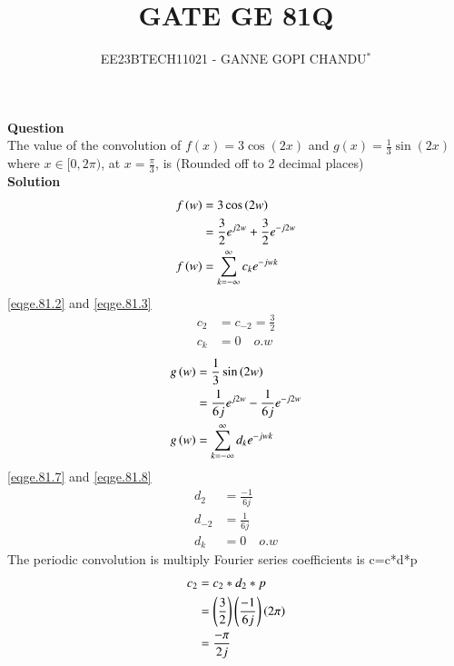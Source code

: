 \documentclass[journal,12pt,twocolumn]{IEEEtran}
\theoremstyle{remark}
\begin{document}

\vspace{3cm}
\title{GATE GE 81Q}
\author{EE23BTECH11021 - GANNE GOPI CHANDU$^{*}$%
}
\maketitle
\bigskip
\renewcommand{\thefigure}{\theenumi}
\renewcommand{\thetable}{\theenumi}

\textbf{Question}\\
The value of the convolution of $f(x) = 3\cos(2x)$ and $g(x) = \frac{1}{3}\sin(2x)$ where $x \in [0, 2\pi)$, at $x = \frac{\pi}{3}$, is (Rounded off to 2 decimal places)\\
\textbf{Solution}\\
\fi
\begin{align}
    f\brak{w}&=3\cos\brak{2w}\\
    &=\frac{3}{2}e^{j2w}+\frac{3}{2}e^{-j2w} \label{eqge.81.2}\\
    f\brak{w}&=\sum_{k=-\infty}^{\infty}c_k e^{-j w k} \label{eqge.81.3}
\end{align}
    \eqref{eqge.81.2} and \eqref{eqge.81.3} \\
\begin{align}
   c_2&=c_{-2}=\frac{3}{2}\\
   c_{k}&=0 \quad{o.w}
\end{align}
\begin{align}
    g\brak{w}&=\frac{1}{3}\sin\brak{2w}\\
    &=\frac{1}{6j}e^{j2w}-\frac{1}{6j}e^{-j2w} \label{eqge.81.7} \\
    g\brak{w}&=\sum_{k=-\infty}^{\infty}d_{k} e^{-j w k} \label{eqge.81.8}
\end{align}
    \eqref{eqge.81.7} and \eqref{eqge.81.8} \\
\begin{align}
   d_{2}&=\frac{-1}{6j}\\
   d_{-2}&=\frac{1}{6j}\\
   d_{k}&=0 \quad{o.w}
\end{align}
The periodic convolution is multiply Fourier series coefficients is
c=c*d*p\\
\begin{align}
    c_{2}&=c_{2}*d_{2}*p\\
    &=\left(\frac{3}{2}\right)\left(\frac{-1}{6j}\right)\left(2\pi\right)\\
    &=\frac{-\pi}{2j}
\end{align}
\end{document}
